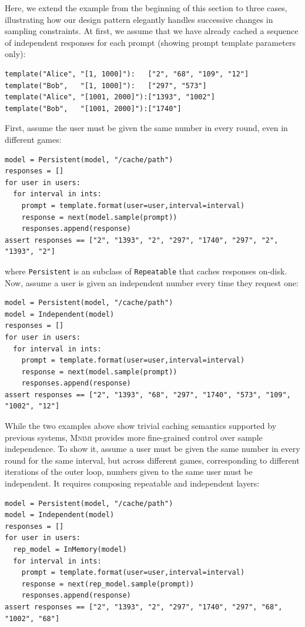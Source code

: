 \documentclass[sigconf]{acmart}
\newcommand{\projName}{\textsc{Mnimi}\xspace}
\begin{document}
Here, we extend the example from the beginning of this section to three cases, illustrating how our design pattern elegantly handles successive changes in sampling constraints. At first, we assume that we have  already cached a sequence of independent responses for each prompt (showing prompt template parameters only):

\begin{lstlisting}[frame=none]
template("Alice", "[1, 1000]"):   ["2", "68", "109", "12"] 
template("Bob",   "[1, 1000]"):   ["297", "573"]
template("Alice", "[1001, 2000]"):["1393", "1002"] 
template("Bob",   "[1001, 2000]"):["1740"]
\end{lstlisting}

First, assume the user must be given the same number in every round, even in different games:

\begin{lstlisting}
model = Persistent(model, "/cache/path")
responses = []
for user in users:
  for interval in ints:
    prompt = template.format(user=user,interval=interval)
    response = next(model.sample(prompt))
    responses.append(response)
assert responses == ["2", "1393", "2", "297", "1740", "297", "2", "1393", "2"]
\end{lstlisting}

\noindent where \texttt{Persistent} is an subclass of \texttt{Repeatable} that caches responses on-disk. Now, assume a user is given an independent number every time they request one:

\begin{lstlisting}
model = Persistent(model, "/cache/path")  
model = Independent(model)
responses = []
for user in users:
  for interval in ints:
    prompt = template.format(user=user,interval=interval)
    response = next(model.sample(prompt))
    responses.append(response)
assert responses == ["2", "1393", "68", "297", "1740", "573", "109", "1002", "12"]
\end{lstlisting}

While the two examples above show trivial caching semantics supported by previous systems, \projName provides more fine-grained control over sample independence. To show it, assume a user must be given the same number in every round for the same interval, but across different games, corresponding to different iterations of the outer loop, numbers given to the same user must be independent. It requires composing repeatable and independent layers:

\begin{lstlisting}
model = Persistent(model, "/cache/path")  
model = Independent(model)
responses = []
for user in users:
  rep_model = InMemory(model)
  for interval in ints:
    prompt = template.format(user=user,interval=interval)
    response = next(rep_model.sample(prompt))
    responses.append(response)
assert responses == ["2", "1393", "2", "297", "1740", "297", "68", "1002", "68"]
\end{lstlisting}
\end{document}
